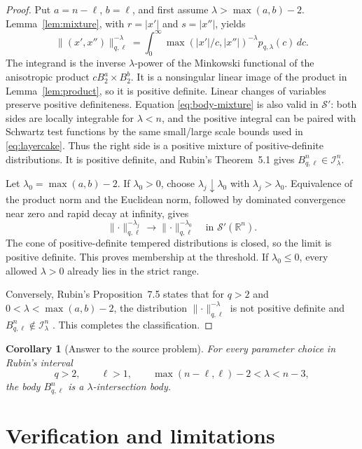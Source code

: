 \documentclass[11pt]{article}
\newtheorem{corollary}{Corollary}
\theoremstyle{remark}
\newcommand{\R}{\mathbb R}
\newcommand{\Sclass}{\mathcal S}
\newcommand{\Iclass}{\mathcal I}
\newcommand{\norm}[1]{\lVert #1\rVert}
\begin{document}
\begin{proof}
Put $a=n-\ell$, $b=\ell$, and first assume
$\lambda>\max(a,b)-2$.  Lemma~\ref{lem:mixture}, with
$r=|x'|$ and $s=|x''|$, yields
\begin{equation}\label{eq:body-mixture}
\norm{(x',x'')}_{q,\ell}^{-\lambda}
=\int_0^\infty
\max(|x'|/c,|x''|)^{-\lambda}p_{q,\lambda}(c)\,dc.
\end{equation}
The integrand is the inverse $\lambda$-power of the Minkowski functional
of the anisotropic product $cB_2^a\times B_2^b$.  It is a nonsingular
linear image of the product in Lemma~\ref{lem:product}, so it is positive
definite.  Linear changes of variables preserve positive definiteness.
Equation \eqref{eq:body-mixture} is also valid in $\Sclass'$: both sides are
locally integrable for $\lambda<n$, and the positive integral can be paired
with Schwartz test functions by the same small/large scale bounds used in
\eqref{eq:layercake}.  Thus the right side is a positive mixture of
positive-definite distributions.  It is positive definite, and Rubin's
Theorem~5.1 gives $B^n_{q,\ell}\in\Iclass^n_\lambda$.

Let $\lambda_0=\max(a,b)-2$.  If $\lambda_0>0$, choose
$\lambda_j\downarrow\lambda_0$ with $\lambda_j>\lambda_0$.  Equivalence of
the product norm and the Euclidean norm, followed by dominated convergence
near zero and rapid decay at infinity, gives
\[
\norm{\cdot}_{q,\ell}^{-\lambda_j}
\longrightarrow
\norm{\cdot}_{q,\ell}^{-\lambda_0}
\quad\text{in }\Sclass'(\R^n).
\]
The cone of positive-definite tempered distributions is closed, so the
limit is positive definite.  This proves membership at the threshold.  If
$\lambda_0\leq0$, every allowed $\lambda>0$ already lies in the strict
range.

Conversely, Rubin's Proposition~7.5 states that for $q>2$ and
$0<\lambda<\max(a,b)-2$, the distribution
$\norm{\cdot}_{q,\ell}^{-\lambda}$ is not positive definite and
$B^n_{q,\ell}\notin\Iclass^n_\lambda$ \cite{Rubin}.  This completes the
classification.
\end{proof}

\begin{corollary}[Answer to the source problem]
For every parameter choice in Rubin's interval
\[
q>2,\qquad \ell>1,\qquad
\max(n-\ell,\ell)-2<\lambda<n-3,
\]
the body $B^n_{q,\ell}$ is a $\lambda$-intersection body.
\end{corollary}

\section{Verification and limitations}
\end{document}
